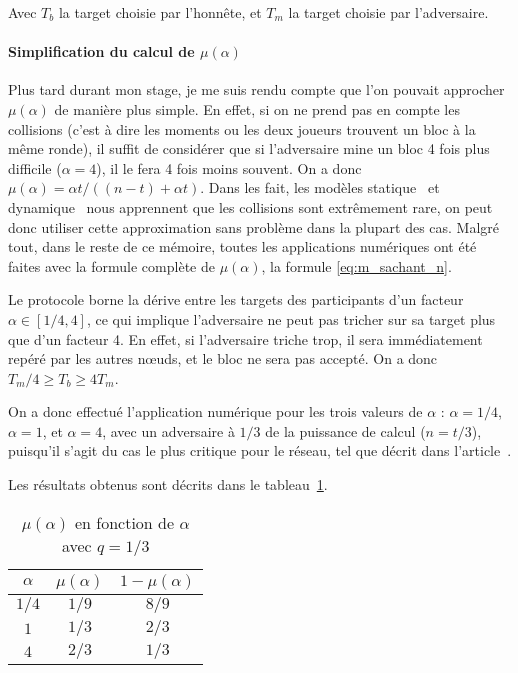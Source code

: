 	Avec $T_b$ la target choisie par l'honnête, et $T_m$ la target choisie par
	l'adversaire.

	\paragraph{Simplification du calcul de $\mu(\alpha)$} Plus tard durant mon
	stage, je me suis rendu compte que l'on pouvait approcher $\mu(\alpha)$ de
	manière plus simple. En effet, si on ne prend pas en compte les collisions
	(c'est à dire les moments ou les deux joueurs trouvent un bloc à la même
	ronde), il suffit de considérer que si l'adversaire mine un bloc 4 fois plus
	difficile ($\alpha = 4$), il le fera 4 fois moins souvent. On a donc
	$\mu(\alpha) = \alpha t/((n-t)+\alpha t)$. Dans les fait, les modèles
	statique~\cite{static_backbone} et dynamique~\cite{dynamic_backbone} nous
	apprennent que les collisions sont extrêmement rare, on peut donc utiliser
	cette approximation sans problème dans la plupart des cas. Malgré tout, dans
	le reste de ce mémoire, toutes les applications numériques ont été faites avec
	la formule complète de $\mu(\alpha)$, la formule \ref{eq:m_sachant_n}.

	Le protocole borne la dérive entre les targets des participants d'un facteur
	$\alpha \in [1/4, 4]$, ce qui implique l'adversaire ne peut pas tricher sur sa
	target plus que d'un facteur 4. En effet, si l'adversaire triche trop, il sera
	immédiatement repéré par les autres nœuds, et le bloc ne sera pas accepté. On
	a donc $T_m/4 \geq T_b \geq 4T_m$.

	On a donc effectué l'application numérique pour les trois valeurs de $\alpha$
	: $\alpha = 1/4$, $\alpha = 1$, et $\alpha = 4$, avec un adversaire à $1/3$ de
	la puissance de calcul ($n = t/3$), puisqu'il s'agit du cas le plus critique
	pour le réseau, tel que décrit dans l'article~\cite{dynamic_backbone}.
	
	Les résultats obtenus sont décrits dans le tableau~\ref{tab:pbbloc}.

	\begin{table}[h]
		\centering
		\begin{tabular}{|c||c|c|}
			\hline
			$\alpha$ & $\mu(\alpha)$ & $1 - \mu(\alpha)$ \\
			\hline
			$1/4$ & $1/9$ & $8/9$ \\
			$1$ & $1/3$ & $2/3$ \\
			$4$ & $2/3$ & $1/3$\\
			\hline
		\end{tabular}
		\caption{$\mu(\alpha)$ en fonction de $\alpha$ avec $q = 1/3$}
		\label{tab:pbbloc}
	\end{table}

